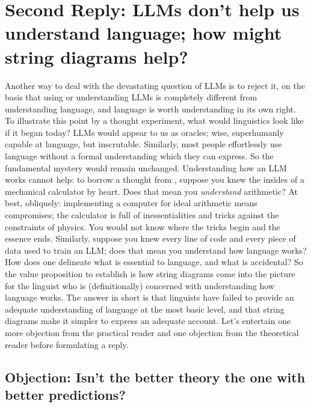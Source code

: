 \section{\textbf{Second Reply:} LLMs don't help us understand language; how might string diagrams help?}

Another way to deal with the devastating question of LLMs is to reject it, on the basis that using or understanding LLMs is completely different from understanding language, and language is worth understanding in its own right. To illustrate this point by a thought experiment, what would linguistics look like if it began today? LLMs would appear to us as oracles; wise, superhumanly capable at language, but inscrutable. Similarly, most people effortlessly use language without a formal understanding which they can express. So the fundamental mystery would remain unchanged. Understanding how an LLM works cannot help: to borrow a thought from \citep{}, suppose you knew the insides of a mechanical calculator by heart. Does that mean you \emph{understand} arithmetic? At best, obliquely: implementing a computer for ideal arithmetic means compromises; the calculator is full of inessentialities and tricks against the constraints of physics. You would not know where the tricks begin and the essence ends. Similarly, suppose you knew every line of code and every piece of data used to train an LLM; does that mean you understand how language works? How does one delineate what is essential to language, and what is accidental? So the value proposition to establish is how string diagrams come into the picture for the linguist who is (definitionally) concerned with understanding how language works. The answer in short is that linguists have failed to provide an adequate understanding of language at the most basic level, and that string diagrams make it simpler to express an adequate account. Let's entertain one more objection from the practical reader and one objection from the theoretical reader before formulating a reply.

\subsection{\textbf{Objection:} Isn't the better theory the one with better predictions?}

